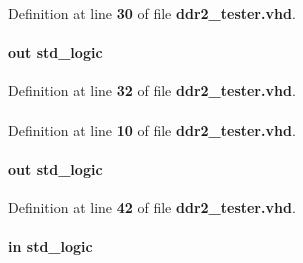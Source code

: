Definition at line {\bf 30} of file {\bf ddr2\+\_\+tester.\+vhd}.

\paragraph[{mem\+\_\+we\+\_\+n}]{ {\bfseries \textcolor{keywordflow}{out}\textcolor{vhdlchar}{ }} {\bfseries \textcolor{comment}{std\+\_\+logic}\textcolor{vhdlchar}{ }} \hspace{0.3cm}{\ttfamily [Port]}}\label{classddr2__tester_a3aabbfab3ba48c3d77176a1c7caf2bce}


Definition at line {\bf 32} of file {\bf ddr2\+\_\+tester.\+vhd}.

\paragraph[{numeric\+\_\+std}]{\hspace{0.3cm}{\ttfamily [Package]}}\label{classddr2__tester_a2edc34402b573437d5f25fa90ba4013e}


Definition at line {\bf 10} of file {\bf ddr2\+\_\+tester.\+vhd}.

\paragraph[{pass}]{ {\bfseries \textcolor{keywordflow}{out}\textcolor{vhdlchar}{ }} {\bfseries \textcolor{comment}{std\+\_\+logic}\textcolor{vhdlchar}{ }} \hspace{0.3cm}{\ttfamily [Port]}}\label{classddr2__tester_a6f74b23545eddf571f51af4b1b13467c}


Definition at line {\bf 42} of file {\bf ddr2\+\_\+tester.\+vhd}.

\paragraph[{pll\+\_\+ref\+\_\+clk}]{ {\bfseries \textcolor{keywordflow}{in}\textcolor{vhdlchar}{ }} {\bfseries \textcolor{comment}{std\+\_\+logic}\textcolor{vhdlchar}{ }} \hspace{0.3cm}{\ttfamily [Port]}}\label{classddr2__tester_ae692cce64f02bb21817ff05dc00a19b9}


